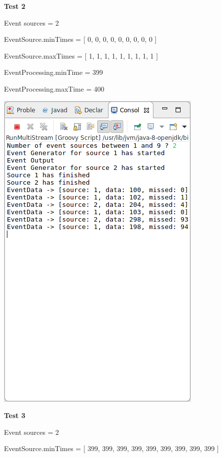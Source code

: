 \textbf{Test 2}

Event sources = 2

EventSource.minTimes = [ 0, 0, 0, 0, 0, 0, 0, 0, 0 ]

EventSource.maxTimes = [ 1, 1, 1, 1, 1, 1, 1, 1, 1 ]

EventProcessing.minTime = 399

EventProcessing.maxTime = 400

\includegraphics[width=\textwidth/2]{img/screenshots/9-2-2.png}

\textbf{Test 3}

Event sources = 2

EventSource.minTimes = [ 399, 399, 399, 399, 399, 399, 399, 399, 399 ]


